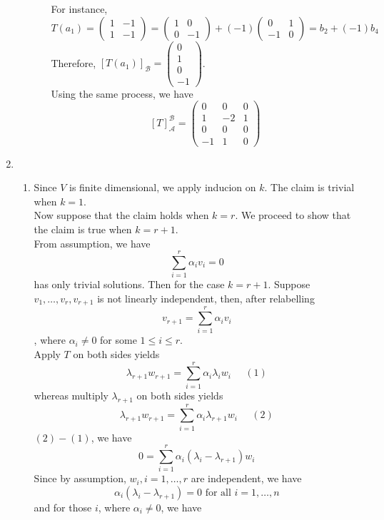 \documentclass[12pt]{article}
\theoremstyle{definition}
\begin{document}
\begin{enumerate}
\begin{enumerate}
\begin{enumerate}
\[  \]
  For instance,
  \[
T(a_1) = \begin{pmatrix}1&-1\\1&-1\end{pmatrix} = \begin{pmatrix}1&0\\0&-1\end{pmatrix}+(-1)\begin{pmatrix}0&1\\-1&0\end{pmatrix} = b_2+(-1)b_4
  \]
  Therefore, $[T(a_1)]_\mathcal{B} = \begin{pmatrix}0\\1\\0\\-1\end{pmatrix}$.\\
  Using the same process, we have
  \[
[T]_\mathcal{A}^\mathcal{B}=\begin{pmatrix}0&0&0\\1&-2&1\\0&0&0\\-1&1&0\end{pmatrix}
  \]
        \end{enumerate}
\end{enumerate}
\item 
\begin{enumerate}
  \item Since $V$ is finite dimensional, we apply inducion on $k$. The claim is trivial when $k = 1$.\\Now suppose that the claim holds when $k = r$. We proceed to show that the claim is true when $k = r+1$.\\
  From assumption, we have
  \[
\sum_{i=1}^r \alpha_iv_i = 0
  \]
  has only trivial solutions. Then for the case $k = r+1$. Suppose $v_1,\ldots, v_r,v_{r+1}$ is not linearly independent, then, after relabelling
  \[
v_{r+1} = \sum_{i=1}^r \alpha_i v_i
  \], where $\alpha_i\neq 0$ for some $1\leq i\leq r$.\\Apply $T$ on both sides yields
  \[
\lambda_{r+1}w_{r+1}=\sum_{i=1}^r \alpha_i\lambda_iw_i\;\;\;\;\;(1)
  \]
  whereas multiply $\lambda_{r+1}$ on both sides yields
  \[
\lambda_{r+1}w_{r+1}=\sum_{i=1}^r \alpha_i\lambda_{r+1}w_i\;\;\;\;\;(2)
  \]
  $(2)-(1)$, we have
  \[
0 =\sum_{i=1}^r\alpha_i(\lambda_i-\lambda_{r+1})w_i
  \]
  Since by assumption, $w_i, i = 1,\ldots, r$ are independent, we have
  \[
\alpha_i(\lambda_i-\lambda_{r+1})= 0 \text{ for all }i = 1,\ldots, n 
  \]
  and for those $i$, where $\alpha_i\neq 0$, we have

\end{enumerate}
\end{enumerate}
\end{document}
